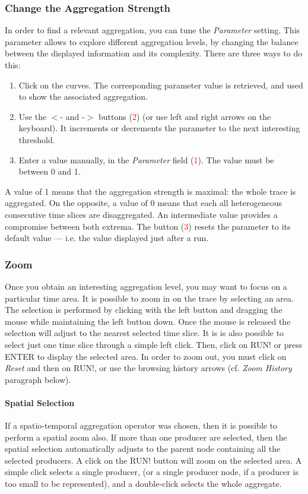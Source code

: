 \documentclass[twoside]{article}
\begin{document}
\begin{sloppypar}
\subsubsection{Change the Aggregation Strength}
In order to find a relevant aggregation, you can tune the \textit{Parameter} setting. This parameter allows to explore different aggregation levels, by changing the balance between the displayed information and its complexity. There are three ways to do this:
\begin{enumerate}
	\item Click on the curves. The corresponding parameter value is retrieved, and used to show the associated aggregation.
	\item Use the $<$- and -$>$ buttons (\textcolor{red}{2}) (or use left and right arrows on the keyboard). It increments or decrements the parameter to the next interesting threshold.
	\item Enter a value manually, in the \textit{Parameter} field (\textcolor{red}{1}). The value must be between 0 and 1.
\end{enumerate}
A value of 1 means that the aggregation strength is maximal: the whole trace is aggregated. On the opposite, a value of 0 means that each all heterogeneous consecutive time slices are disaggregated. An intermediate value provides a compromise between both extrema. The button (\textcolor{red}{3}) resets the parameter to its default value --- i.e. the value displayed just after a run.

\subsubsection{Zoom}
Once you obtain an interesting aggregation level, you may want to focus on a particular time area. It is possible to zoom in on the trace by selecting an area. The selection is performed by clicking with the left button and dragging the mouse while maintaining the left button down. Once the mouse is released the selection will adjust to the nearest selected time slice. It is is also possible to select just one time slice through a simple left click. Then, click on RUN! or press ENTER to display the selected area. In order to zoom out, you must click on \textit{Reset} and then on RUN!, or use the browsing history arrows (cf. \emph{Zoom History} paragraph below).

\paragraph{Spatial Selection}
If a spatio-temporal aggregation operator was chosen, then it is possible to perform a spatial zoom also. If more than one producer are selected, then the spatial selection automatically adjusts to the parent node containing all the selected producers. A click on the RUN! button will zoom on the selected area. A simple click selects a single producer, (or a single producer node, if a producer is too small to be represented), and a double-click selects the whole aggregate.


\end{sloppypar}
\end{document}

